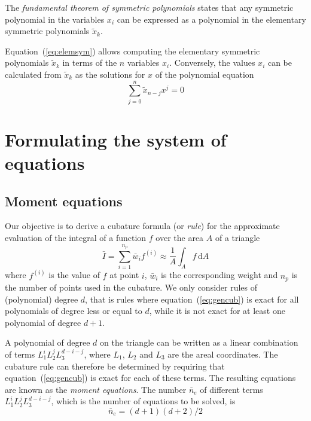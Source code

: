 \documentclass{article}
\begin{document}
The \emph{fundamental theorem of symmetric polynomials} states that any symmetric polynomial in the variables $x_i$ can be expressed as a polynomial in the elementary symmetric polynomials $\tilde{x}_k$.

Equation~(\ref{eq:elemsym}) allows computing the elementary symmetric polynomials $\tilde{x}_k$ in terms of the $n$ variables $x_i$. Conversely, the values $x_i$ can be calculated from $\tilde{x}_k$ as the solutions for $x$ of the polynomial equation
\begin{equation}
  \sum_{j=0}^{n} \tilde{x}_{n-j} x^j = 0
\end{equation}




\section{Formulating the system of equations}
\label{sec:formulating}

\subsection{Moment equations}
\label{sec:momeqs}

Our objective is to derive a cubature formula (or \emph{rule}) for the approximate evaluation of the integral of a function $f$ over the area $A$ of a triangle
\begin{equation}
  \label{eq:gencub}
  \bar{I} = \sum_{i=1}^{n_p} \bar{w}_i f^{(i)}
          \approx  \frac{1}{A} \int_A f \,\mathrm{d} A
\end{equation}
where $f^{(i)}$ is the value of $f$ at point $i$, $\bar{w}_i$ is the corresponding weight and $n_p$ is the number of points used in the cubature. We only consider rules of (polynomial) degree $d$, that is rules where equation~(\ref{eq:gencub}) is exact for all polynomials of degree less or equal to $d$, while it is not exact for at least one polynomial of degree $d+1$.

A polynomial of degree $d$ on the triangle can be written as a linear combination of terms $L_1^i L_2^j L_3^{d-i-j}$, where $L_1$, $L_2$ and $L_3$ are the areal coordinates. The cubature rule can therefore be determined by requiring that equation~(\ref{eq:gencub}) is exact for each of these terms. The resulting equations are known as the \emph{moment equations}. The number $\bar{n}_e$ of different terms $L_1^i L_2^j L_3^{d-i-j}$, which is the number of equations to be solved, is
\begin{equation}
  \label{eq:ne_bar}
  \bar{n}_e = (d+1)(d+2)/2
\end{equation}
\end{document}
